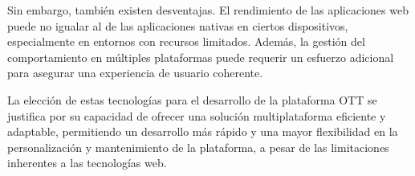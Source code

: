 Sin embargo, también existen desventajas. El rendimiento de las aplicaciones web puede no igualar al de las 
aplicaciones nativas en ciertos dispositivos, especialmente en entornos con recursos limitados. Además, la 
gestión del comportamiento en múltiples plataformas puede requerir un esfuerzo adicional para asegurar una 
experiencia de usuario coherente.

La elección de estas tecnologías para el desarrollo de la plataforma OTT se justifica por su capacidad de 
ofrecer una solución multiplataforma eficiente y adaptable, permitiendo un desarrollo más rápido y una 
mayor flexibilidad en la personalización y mantenimiento de la plataforma, a pesar de las limitaciones 
inherentes a las tecnologías web.
